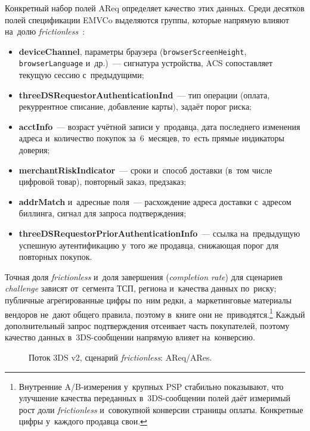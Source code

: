 Конкретный набор полей AReq определяет качество этих данных. Среди десятков
полей спецификации EMVCo выделяются группы, которые напрямую влияют на~долю
\textit{frictionless}~\cite{emvco-3ds-whitepaper}:

\begin{itemize}
  \item \textbf{deviceChannel}, параметры браузера
    (\texttt{browserScreen\allowbreak Height}, \texttt{browser\allowbreak Language} и~др.)~---
    сигнатура устройства, ACS сопоставляет текущую сессию с~предыдущими;
  \item \textbf{threeDSRequestorAuthenticationInd}~--- тип операции (оплата,
    рекуррентное списание, добавление карты), задаёт порог риска;
  \item \textbf{acctInfo}~--- возраст учётной записи у~продавца, дата последнего
    изменения адреса и~количество покупок за~6~месяцев, то~есть прямые
    индикаторы доверия;
  \item \textbf{merchantRiskIndicator}~--- сроки и~способ доставки
    (в~том числе цифровой товар), повторный заказ, предзаказ;
  \item \textbf{addrMatch} и~адресные поля~--- расхождение адреса доставки
    с~адресом биллинга, сигнал для запроса подтверждения;
  \item \textbf{threeDSRequestorPriorAuthenticationInfo}~--- ссылка
    на~предыдущую успешную аутентификацию у~того же продавца, снижающая
    порог для повторных покупок.
\end{itemize}

Точная доля \textit{frictionless}
и~доля завершения (\textit{completion rate}) для сценариев \textit{challenge}
зависят от~сегмента ТСП, региона и~качества данных по~риску; публичные
агрегированные цифры по~ним редки, а~маркетинговые материалы вендоров не~дают
общего правила, поэтому в~книге они не~приводятся.\footnote{Внутренние
  A/B-измерения у~крупных PSP стабильно показывают, что улучшение качества
  переданных в~3DS-сообщении полей даёт измеримый рост доли \textit{frictionless}
  и~совокупной конверсии страницы оплаты. Конкретные цифры у~каждого
продавца свои.} Каждый
дополнительный запрос подтверждения отсеивает часть покупателей, поэтому качество данных
в~3DS-сообщении напрямую влияет на~конверсию.

\begin{figure}[htbp]
  \centering
  \caption{Поток 3DS v2, сценарий \textit{frictionless}: AReq/ARes.}%
  \label{fig:3ds-v2-flow-frictionless}
\end{figure}

